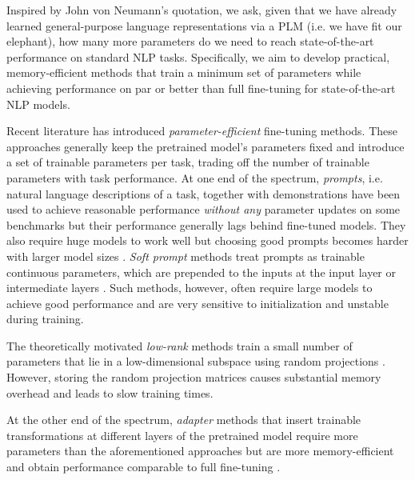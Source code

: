 Inspired by John von Neumann's quotation, we ask, given that we have already learned general-purpose language representations via a PLM (i.e. we have fit our elephant), how many more parameters do we need to reach state-of-the-art performance on standard NLP tasks. Specifically, we aim to develop practical, memory-efficient methods that train a minimum set of parameters while achieving performance on par or better than full fine-tuning for state-of-the-art NLP models.

Recent literature has introduced \emph{parameter-efficient} fine-tuning methods. These approaches generally keep the pretrained model's parameters fixed and introduce a set of trainable parameters per task, trading off the number of trainable parameters with task performance. At one end of the spectrum, \emph{prompts}, i.e. natural language descriptions of a task, together with demonstrations have been used to achieve reasonable performance \emph{without any} parameter updates on some benchmarks \citep{brown2020gpt3} but their performance generally lags behind fine-tuned models. They also require huge models to work well but choosing good prompts becomes harder with larger model sizes \citep{Perez2021true}. \emph{Soft prompt} methods treat prompts as trainable continuous parameters, which are prepended to the inputs at the input layer or intermediate layers \citep{li2021prefix,hambardzumyan2021warp,lester2021power}. Such methods, however, often require large models to achieve good performance and are very sensitive to initialization and unstable during training. 

The theoretically motivated \emph{low-rank} methods train a small number of parameters that lie in a low-dimensional subspace using random projections \citep{li2018measuring,aghajanyan2020intrinsic}. However, storing the random projection matrices causes substantial memory overhead and leads to slow training times.

At the other end of the spectrum, \emph{adapter} methods \citep{rebuffi2018efficient, houlsby2019parameter} that insert trainable transformations at different layers of the pretrained model require more parameters than the aforementioned approaches but are more memory-efficient and obtain performance comparable to full fine-tuning \citep{houlsby2019parameter, linz-etal-2020-exploring}.

